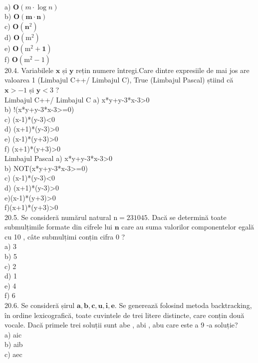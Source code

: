 {{\\
a) $\mathbf{O}(m \cdot \log n)$
\\
b) $\mathbf{O}(\mathbf{m} \cdot \mathbf{n})$
\\
c) $\mathbf{O}\left(\mathbf{n}^{2}\right)$
\\
d) $\mathbf{O}\left(\mathrm{m}^{2}\right)$
\\
e) $\mathbf{O}\left(\mathrm{m}^{2}+\mathbf{1}\right)$
\\
f) $\mathbf{O}\left(\mathrm{m}^{2}-1\right)$
\\
20.4. Variabilele $\mathbf{x}$ și $\mathbf{y}$ rețin numere întregi.Care dintre expresiile de mai jos are valoarea 1 (Limbajul C++/ Limbajul C), True (Limbajul Pascal) știind că $\mathbf{x}>-1$ și $\mathbf{y}<3$ ?
\\
Limbajul C++/ Limbajul C
a) x*y+y-3*x-3>0
\\
b) !(x*y+y-3*x-3>=0)
\\
c) (x-1)*(y-3)<0
\\
d) (x+1)*(y-3)>0
\\
e) (x-1)*(y+3)>0
\\
f) (x+1)*(y+3)>0
\\
Limbajul Pascal
a) x*y+y-3*x-3>0
\\
b) NOT(x*y+y-3*x-3>=0)
\\
c) (x-1)*(y-3)<0
\\
d) (x+1)*(y-3)>0
\\
e)(x-1)*(y+3)>0
\\
f)(x+1)*(y+3)>0
\\
20.5. Se consideră numărul natural $\mathrm{n}=231045$. Dacă se determină toate submulțimile formate din cifrele lui $\mathbf{n}$ care au suma valorilor componentelor egală cu 10 , câte submulțimi conțin cifra 0 ?
\\
a) 3
\\
b) 5
\\
c) 2
\\
d) 1
\\
e) 4
\\
f) 6
\\
20.6. Se consideră șirul ${\mathbf{a}, \mathbf{b}, \mathbf{c}, \mathbf{u}, \mathbf{i}, \mathbf{e}}$. Se generează folosind metoda backtracking, în ordine lexicografică, toate cuvintele de trei litere distincte, care conțin două vocale. Dacă primele trei soluții sunt abe , abi , abu care este a 9 -a soluție?
\\
a) aic
\\
b) aib
\\
c) aec
\\
}}

